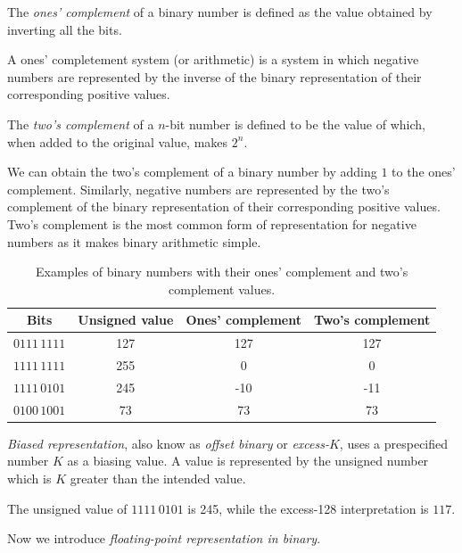 \begin{definition}
	The \emph{ones' complement} of a binary number is defined as the value
	obtained by inverting all the bits.
\end{definition}

A ones' completement system (or arithmetic) is a system in which negative
numbers are represented by the inverse of the binary representation of their
corresponding positive values.

\begin{definition}
	The \emph{two's complement} of a $n$-bit number is defined to be the value
	of which, when added to the original value, makes $2^n$.
\end{definition}

We can obtain the two's complement of a binary number by adding $1$ to
the ones' complement.
Similarly, negative numbers are represented by the two's complement of the
binary representation of their corresponding positive values.
Two's complement is the most common form of representation for negative 
numbers as it makes binary arithmetic simple.

\begin{table}
	\caption{Examples of binary numbers with their ones' complement and
	two's complement values.}
	\centering
	\begin{tabular}{cccc}
		\toprule
		Bits & Unsigned value & Ones' complement & Two's complement \\
		\midrule
		$0111\,1111$ & 127 & 127 & 127 \\
		$1111\,1111$ & 255 & 0 & 0 \\
		$1111\,0101$ & 245 & -10 & -11 \\
		$0100\,1001$ & 73 & 73 & 73 \\
		\bottomrule
	\end{tabular}
\end{table}

\begin{definition}
	\emph{Biased representation}, also know as \emph{offset binary} or
	\emph{excess-$K$}, uses a prespecified number $K$ as a biasing value.
	A value is represented by the unsigned number which is $K$ greater than the
	intended value.
\end{definition}

The unsigned value of $1111\,0101$ is 245, while the 
excess-128 interpretation is $117$.

Now we introduce \emph{floating-point representation in binary}.


